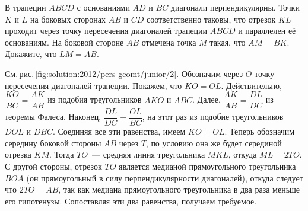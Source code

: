 \problem
В трапеции $ABCD$ с основаниями $AD$ и $BC$ диагонали перпендикулярны.
Точки $K$ и $L$ на боковых сторонах $AB$ и $CD$ соответственно таковы, что
отрезок $KL$ проходит через точку пересечения диагоналей трапеции $ABCD$ и
параллелен её основаниям.
На боковой стороне $AB$ отмечена точка $M$ такая, что $AM = BK$.
Докажите, что $LM = AB$.

%
\label{solution:2012/pers-geomt/junior/2}%
См.\,рис.\,\ref{fig:solution:2012/pers-geomt/junior/2}.
Обозначим через $O$ точку пересечения диагоналей трапеции.
Покажем, что $KO = OL$.
Действительно, $\dfrac{KO}{BC} = \dfrac{AK}{AB}$ из подобия треугольников
$AKO$ и $ABC$.
Далее, $\dfrac{AK}{AB} = \dfrac{DL}{DC}$ из теоремы Фалеса.
Наконец, $\dfrac{DL}{DC} = \dfrac{OL}{BC}$, на этот раз из подобие
треугольников $DOL$ и $DBC$.
Соединяя все эти равенства, имеем $KO = OL$.
Теперь обозначим середину боковой стороны $AB$ через $T$, по условию она же
будет серединой отрезка $KM$.
Тогда $TO$~--- средняя линия треугольника $MKL$, откуда $ML = 2 TO$.
С другой стороны, отрезок $TO$ является медианой прямоугольного треугольника
$BOA$
(он прямоугольный в силу перпендикулярности диагоналей),
откуда следует что $2 TO = AB$, так как медиана прямоугольного треугольника в
два раза меньше его гипотенузы.
Сопоставляя эти два равенства, получаем требуемое.

\endproblem
